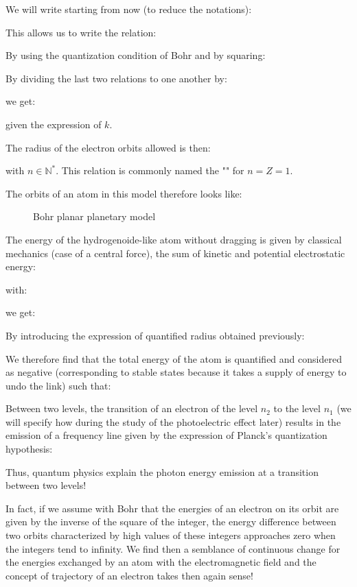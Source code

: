We will write starting from now (to reduce the notations):
	
This allows us to write the relation:
	
By using the quantization condition of Bohr and by squaring:
	
By dividing the last two relations to one another by:
	
we get:
		
given the expression of $k$.

The radius of the electron orbits allowed is then:
	
with $n \in \mathbb{N}^{*}$. This relation is commonly named the "\label{bohr radius}" for $n=Z=1$.

The orbits of an atom in this model therefore looks like:

\begin{figure}[H]
\centering
{}
\caption{Bohr planar planetary model}
\end{figure}
The energy of the hydrogenoide-like atom without dragging is given by classical mechanics (case of a central force), the sum of kinetic and potential electrostatic energy:
	
with:
	
we get:
	
By introducing the expression of quantified radius obtained previously:
	
	
We therefore find that the total energy of the atom is quantified and considered as negative (corresponding to stable states because it takes a supply of energy to undo the link) such that:
	
Between two levels, the transition of an electron of the level $n_2$ to the level $n_1$ (we will specify how during the study of the photoelectric effect later) results in the emission of a frequency line given by the expression of Planck's quantization hypothesis:
	
Thus, quantum physics explain the photon energy emission at a transition between two levels!

In fact, if we assume with Bohr that the energies of an electron on its orbit are given by the inverse of the square of the integer, the energy difference between two orbits characterized by high values of these integers approaches zero when the integers tend to infinity. We find then a semblance of continuous change for the energies exchanged by an atom with the electromagnetic field and the concept of trajectory of an electron takes then again sense!

